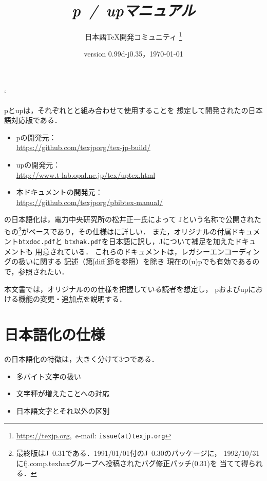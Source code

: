 \documentclass[a4paper,11pt,nomag,dvipdfmx]{jsarticle}
\def\file#1{\texttt{#1}}
\def\JBibTeX{\leavevmode\textcompwordmark\lower.5ex\hbox{J}\kern-.08em\BibTeX}
\def\pBibTeX{p\kern-.05em\BibTeX}
\def\upBibTeX{u\pBibTeX}
\def\JBibTeX{J\BibTeX}%
\def\pBibTeX{p\BibTeX}%
\def\upBibTeX{u\pBibTeX}%
\begin{document}
\catcode`
\title{\emph{\pBibTeX~/~\upBibTeX マニュアル}}
\author{日本語\TeX 開発コミュニティ\null
\thanks{\url{https://texjp.org},\ e-mail: \texttt{issue(at)texjp.org}}}
\date{version 0.99d-j0.35，\today}
\maketitle

\pBibTeX と\upBibTeX は，それぞれ\pTeX と\upTeX と組み合わせて使用することを
想定して開発された\BibTeX の日本語対応版である．
\begin{itemize}
  \item \pBibTeX の開発元：\\
    \url{https://github.com/texjporg/tex-jp-build/}
  \item \upBibTeX の開発元：\\
    \url{http://www.t-lab.opal.ne.jp/tex/uptex.html}
  \item 本ドキュメントの開発元：\\
    \url{https://github.com/texjporg/pbibtex-manual/}
\end{itemize}

\BibTeX の日本語化は，電力中央研究所の松井正一氏によって
\JBibTeX という名称で公開されたもの\footnote{%
最終版は\JBibTeX~0.31である．1991/01/01付の\JBibTeX~0.30のパッケージに，
1992/10/31にfj.comp.texhaxグループへ投稿されたバグ修正パッチ(0.31)を
当てて得られる．}がベースであり，その仕様は\cite{jbibtex}に詳しい．
また，オリジナルの\BibTeX 付属ドキュメント\file{btxdoc.pdf}と
\file{btxhak.pdf}を日本語に訳し，\JBibTeX について補足を加えたドキュメントも
用意されている\cite{jbtxdoc,jbtxhak}．
これらのドキュメントは，レガシーエンコーディングの扱いに関する
記述（第\ref{diff}節を参照）を除き
現在の(u)\pBibTeX でも有効であるので，参照されたい．

本文書では，オリジナルの\BibTeX の仕様を把握している読者を想定し，
\pBibTeX および\upBibTeX における機能の変更・追加点を説明する．

\clearpage
\tableofcontents
\clearpage

\section{日本語化の仕様}

\BibTeX の日本語化の特徴は，大きく分けて3つである．
\begin{itemize}
 \item 多バイト文字の扱い
 \item 文字種が増えたことへの対応
 \item 日本語文字とそれ以外の区別
\end{itemize}
\end{document}
